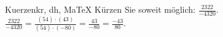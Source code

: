 \begin{MAufgabe}{Kuerzen}{kr, dh, MaTeX}
K\"urzen Sie soweit m\"oglich: $\frac{2322}{-4320}$.\\ 
\ifLsg\MLoesung
\quad $\frac{2322}{-4320}=\frac{(54)\cdot(43)}{(54)\cdot(-80)}=\frac{43}{-80}=\frac{-43}{80}$.\else\relax\fi
 \end{MAufgabe}